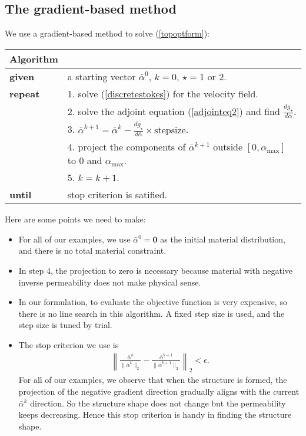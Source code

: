 \subsection{The gradient-based method}
We use a gradient-based method to solve (\ref{topoptform}):

\begin{tabular}{ll}
\textbf{Algorithm} &\\
\hline
\textbf{given}  &    a starting vector $\bar{\alpha}^0$, $k=0$, $\star=1$ or $2$. \\
\textbf{repeat} &    1. solve (\ref{discretestokes}) for the velocity field.   \\
                &    2. solve the adjoint equation (\ref{adjointeq2}) and find $\frac{dg_\star}{d\bar{\alpha}}$. \\
                &    3. $\bar{\alpha}^{k+1} = 
                        \bar{\alpha}^{k}-\frac{dg_\star}{d\bar{\alpha}} \times \text{stepsize}$.   \\
                &    4. project the components of $\bar{\alpha}^{k+1}$ outside $[0,\alpha_\text{max}]$ to $0$ and $\alpha_\text{max}$. \\
                &    5. $k = k+1$.\\
\textbf{until}  &     stop criterion is satified. \\%
\hline
\end{tabular}

\vspace{0.5cm}
 Here are some points we need to make:
\begin{itemize}
\item  For all of our examples, we use $\bar{\alpha}^0 = \mathbf{0}$ as the initial material distribution, and there is no total material constraint.
\item  In step $4$, the projection to zero is necessary because material with negative inverse permeability does not make physical sense.
\item  In our formulation, to evaluate the objective function is very expensive, so there is no line search in this algorithm. A fixed step size is used, and the step size is tuned by trial.  
\item  The stop criterion we use is
       \begin{eqnarray}
         \left\|\frac{\bar{\alpha}^k}{\|\bar{\alpha}^k\|_2}-\frac{\bar{\alpha}^{k+1}}{\|\bar{\alpha}^{k+1}\|_2}\right\|_2 < \epsilon.
       \end{eqnarray}
       For all of our examples, we observe that when the structure is formed,
the projection of the negative gradient direction gradually aligns
with the current $\bar{\alpha}^k$ direction. So the structure shape does not
change but the permeability keeps decreasing. Hence this stop criterion is handy in finding the structure shape.
\end{itemize}
